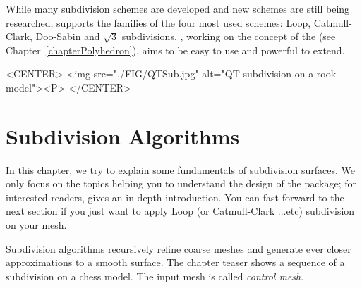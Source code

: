 
While many subdivision schemes are developed and new schemes are 
still being researched,  supports the families 
of the four most used schemes: Loop, Catmull-Clark,
Doo-Sabin and $\sqrt{3}$ subdivisions. , 
working on the concept of the  (see 
Chapter~\ref{chapterPolyhedron}), aims to be easy to use and powerful to
extend.

\begin{ccHtmlOnly}
     <CENTER>
         <img src="./FIG/QTSub.jpg" alt="QT subdivision on a rook model"><P>
     </CENTER>
\end{ccHtmlOnly}

\section{Subdivision Algorithms}
In this chapter, we try to explain some fundamentals of subdivision 
surfaces. We only focus on the topics helping you to understand the 
design of the package; for interested readers, \cite{cgal:ww-smgd-02} 
gives an in-depth introduction.
You can fast-forward to the next section if you 
just want to apply Loop (or Catmull-Clark ...etc) subdivision on your
 mesh.

Subdivision algorithms recursively refine coarse meshes and generate 
ever closer approximations to a smooth surface.
The chapter teaser shows a sequence of a subdivision on 
a chess model. The input mesh is called 
\emph{control mesh}.

